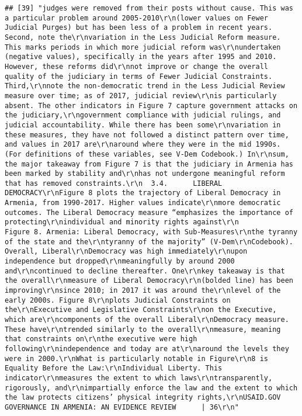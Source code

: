 \documentclass[
]{article}
\begin{document}
\begin{verbatim}
## [39] "judges were removed from their posts without cause. This was a particular problem around 2005-2010\r\n(lower values on Fewer Judicial Purges) but has been less of a problem in recent years. Second, note the\r\nvariation in the Less Judicial Reform measure. This marks periods in which more judicial reform was\r\nundertaken (negative values), specifically in the years after 1995 and 2010. However, these reforms did\r\nnot improve or change the overall quality of the judiciary in terms of Fewer Judicial Constraints. Third,\r\nnote the non-democratic trend in the Less Judicial Review measure over time; as of 2017, judicial review\r\nis particularly absent. The other indicators in Figure 7 capture government attacks on the judiciary,\r\ngovernment compliance with judicial rulings, and judicial accountability. While there has been some\r\nvariation in these measures, they have not followed a distinct pattern over time, and values in 2017 are\r\naround where they were in the mid 1990s. (For definitions of these variables, see V-Dem Codebook.) In\r\nsum, the major takeaway from Figure 7 is that the judiciary in Armenia has been marked by stability and\r\nhas not undergone meaningful reform that has removed constraints.\r\n  3.4.      LIBERAL DEMOCRACY\r\nFigure 8 plots the trajectory of Liberal Democracy in Armenia, from 1990-2017. Higher values indicate\r\nmore democratic outcomes. The Liberal Democracy measure “emphasizes the importance of protecting\r\nindividual and minority rights against\r\n                                         Figure 8. Armenia: Liberal Democracy, with Sub-Measures\r\nthe tyranny of the state and the\r\ntyranny of the majority” (V-Dem\r\nCodebook). Overall, Liberal\r\nDemocracy was high immediately\r\nupon independence but dropped\r\nmeaningfully by around 2000 and\r\ncontinued to decline thereafter. One\r\nkey takeaway is that the overall\r\nmeasure of Liberal Democracy\r\n(bolded line) has been improving\r\nsince 2010; in 2017 it was around the\r\nlevel of the early 2000s. Figure 8\r\nplots Judicial Constraints on the\r\nExecutive and Legislative Constraints\r\non the Executive, which are\r\ncomponents of the overall Liberal\r\nDemocracy measure. These have\r\ntrended similarly to the overall\r\nmeasure, meaning that constraints on\r\nthe executive were high following\r\nindependence and today are at\r\naround the levels they were in 2000.\r\nWhat is particularly notable in Figure\r\n8 is Equality Before the Law:\r\nIndividual Liberty. This indicator\r\nmeasures the extent to which laws\r\ntransparently, rigorously, and\r\nimpartially enforce the law and the extent to which the law protects citizens’ physical integrity rights,\r\nUSAID.GOV                                                  GOVERNANCE IN ARMENIA: AN EVIDENCE REVIEW      | 36\r\n"                                                                                                                                                                                                                                                                                                                                                                                                                                                                                                                
\end{verbatim}
\end{document}
